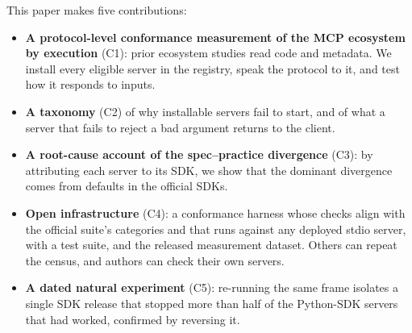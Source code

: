 This paper makes five contributions:
\begin{itemize}
  \item \textbf{A protocol-level conformance measurement of the MCP ecosystem by
    execution} (C1): prior ecosystem studies read code and metadata. We install every
    eligible server in the registry, speak the protocol to it, and test how it
    responds to inputs.
  \item \textbf{A taxonomy} (C2) of why installable servers fail to start, and of
    what a server that fails to reject a bad argument returns to the client.
  \item \textbf{A root-cause account of the spec--practice divergence} (C3): by
    attributing each server to its SDK, we show that the dominant divergence comes from defaults in the official SDKs.
  \item \textbf{Open infrastructure} (C4): a conformance harness whose checks align
    with the official suite's categories and that runs against any deployed stdio
    server, with a test suite, and the released measurement dataset. Others can
    repeat the census, and authors can check their own servers.
  \item \textbf{A dated natural experiment} (C5): re-running the same frame isolates
    a single SDK release that stopped more than half of the Python-SDK servers that had
    worked, confirmed by reversing it.
\end{itemize}
